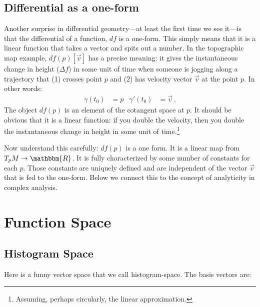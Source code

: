\documentclass[
  11pt,
	colorful,
	raggedright,
]{tufte-style-thesis-flip}
\begin{document}
\section{Differential as a one-form}
\label{sec:d:as:one:form}

Another surprise in differential geometry---at least the first time we see it---is that the differential of a function, $df$ is a one-form. This simply means that it is a linear function that takes a vector and spits out a number. In the topographic map example, $df(p)[\vec{v}]$ has a precise meaning: it gives the instantaneous change in height ($\Delta f$) in some unit of time when someone is jogging along a trajectory that (1) crosses point $p$ and (2) has velocity vector $\vec{v}$ at the point $p$. In other words:
\begin{align}
  \gamma(t_0) &= p & \gamma'(t_0) &= \vec{v} \ .
\end{align}
The object $df(p)$ is an element of the cotangent space at $p$. It should be obvious that it is a linear function: if you double the velocity, then you double the instantaneous change in height in some unit of time.\footnote{Assuming, perhaps circularly, the linear approximation.}

Now understand this carefully: $df(p)$ is a one form. It is a linear map from $T_pM \to \mathbbm{R}$. It is fully characterized by some number of constants for each $p$. Those constants are uniquely defined and are independent of the vector $\vec{v}$ that is fed to the one-form. Below we connect this to the concept of analyticity in complex analysis.

\chapter{Function Space}

\section{Histogram Space}
\label{sec:histogramspace}

Here is a funny vector space that we call histogram-space. The basis vectors are:
\end{document}
